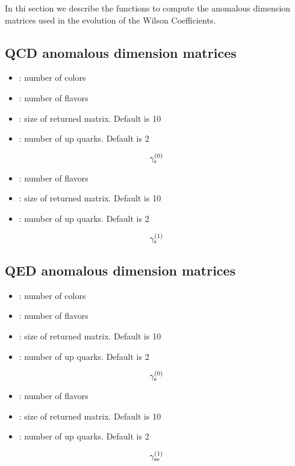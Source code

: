 
In thi section we describe the functions to compute the anomalous dimension
matrices used in the evolution of the Wilson Coefficients.

\subsection{QCD anomalous dimension matrices}


\begin{itemize}
\item {}: number of colors
\item {}: number of flavors
\item {}: size of returned matrix. Default is 10
\item {}: number of up quarks. Default is 2
\end{itemize}

\begin{equation}
\gamma_{\rm s}^{(0)}
\end{equation}

\hrulefill


\begin{itemize}
\item {}: number of flavors
\item {}: size of returned matrix. Default is 10
\item {}: number of up quarks. Default is 2
\end{itemize}

\begin{equation}
\gamma_{\rm s}^{(1)}
\end{equation}

\subsection{QED anomalous dimension matrices}


\begin{itemize}
\item {}: number of colors
\item {}: number of flavors
\item {}: size of returned matrix. Default is 10
\item {}: number of up quarks. Default is 2
\end{itemize}

\begin{equation}
\gamma_{\rm e}^{(0)}
\end{equation}

\hrulefill


\begin{itemize}
\item {}: number of flavors
\item {}: size of returned matrix. Default is 10
\item {}: number of up quarks. Default is 2
\end{itemize}

\begin{equation}
\gamma_{\rm se}^{(1)}
\end{equation}


